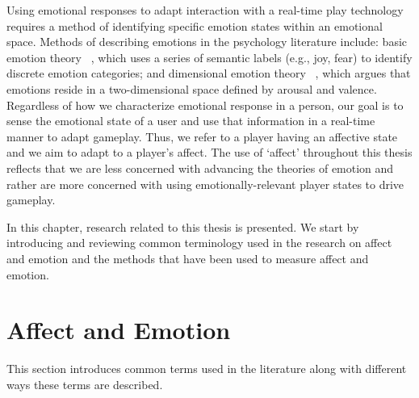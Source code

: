

Using emotional responses to adapt interaction with a real-time play technology requires a method of identifying specific emotion states within an emotional space. Methods of describing emotions in the psychology literature include: basic emotion theory ~\cite{ekman1992argument, ekman1992there}, which uses a series of semantic labels (e.g., joy, fear) to identify discrete emotion categories; and dimensional emotion theory ~\cite{lang1995emotion, russell1989affect}, which argues that emotions reside in a two-dimensional space defined by arousal and valence. Regardless of how we characterize emotional response in a person, our goal is to sense the emotional state of a user and use that information in a real-time manner to adapt gameplay. Thus, we refer to a player having an affective state and we aim to adapt to a player's affect. The use of `affect' throughout this thesis reflects that we are less concerned with advancing the theories of emotion and rather are more concerned with using emotionally-relevant player states to drive gameplay.

In this chapter, research related to this thesis is presented. We start by introducing and reviewing common terminology used in the research on affect and emotion and the methods that have been used to measure affect and emotion.


\section{Affect and Emotion}

This section introduces common terms used in the literature along with different ways these terms are described.

